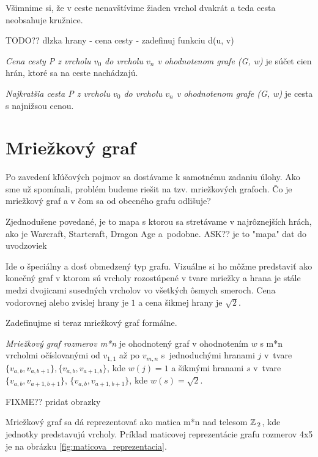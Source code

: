 Všimnime si, že v ceste nenavštívime žiaden vrchol dvakrát a teda cesta neobsahuje kružnice.

TODO?? dlzka hrany - cena cesty - zadefinuj funkciu d(u, v)

\begin{define}
{\sl Cena cesty P z vrcholu $v_0$ do vrcholu $v_n$ v ohodnotenom grafe (G, w) } je súčet cien hrán, ktoré sa na ceste nachádzajú.
\end{define}

\begin{define}
{\sl Najkratšia cesta P z vrcholu $v_0$ do vrcholu $v_n$
v ohodnotenom grafe (G, w)} 
je cesta s najnižsou cenou.
\end{define}





\section{Mriežkový graf}

Po zavedení kľúčových pojmov sa dostávame k samotnému zadaniu úlohy. 
Ako sme už spomínali, problém budeme riešit na tzv. mriežkových grafoch. Čo je mriežkový graf a v čom sa od obecného grafu odlišuje?

Zjednodušene povedané, je to mapa s ktorou sa stretávame v najrôznejších hrách, ako je Warcraft, Startcraft, Dragon Age
a~podobne. ASK?? je to "mapa" dat do uvodzoviek

Ide o špeciálny a dosť obmedzený typ grafu. Vizuálne si ho môžme predstaviť ako konečný graf v ktorom sú vrcholy rozostúpené v tvare mriežky a hrana
je stále medzi dvojicami susedných vrcholov vo všetkých ôsmych smeroch. Cena vodorovnej alebo zvislej hrany je $1$ a cena šikmej hrany je $\sqrt{2}$.


Zadefinujme si teraz mriežkový graf formálne.

\begin{define}
{\sl Mriežkový graf rozmerov m*n} je ohodnotený graf v ohodnotením $w$ s m*n vrcholmi očíslovanými od $v_{1,1}$ až po $v_{m,n}$ 
s~jednoduchými hranami $j$ v~tvare $\{v_{a,b}, v_{a,b+1}\}, \{v_{a,b}, v_{a+1,b}\}$, kde $w(j) = 1$ 
a šikmými hranami $ s $ v~tvare 
$\{v_{a,b}, v_{a+1,b+1}\}$, $\{v_{a,b}, v_{a+1,b+1}\}$, kde $ w(s) = \sqrt{2}$.
\end{define}

FIXME?? pridat obrazky

\begin{note}
	Mriežkový graf sa dá reprezentovať ako matica m*n nad telesom $\mathbb{Z}\,_2$, kde jednotky predstavujú vrcholy. Príklad maticovej reprezentácie grafu rozmerov 4x5 je na obrázku
	\ref{fig:maticova_reprezentacia}.
\end{note}



